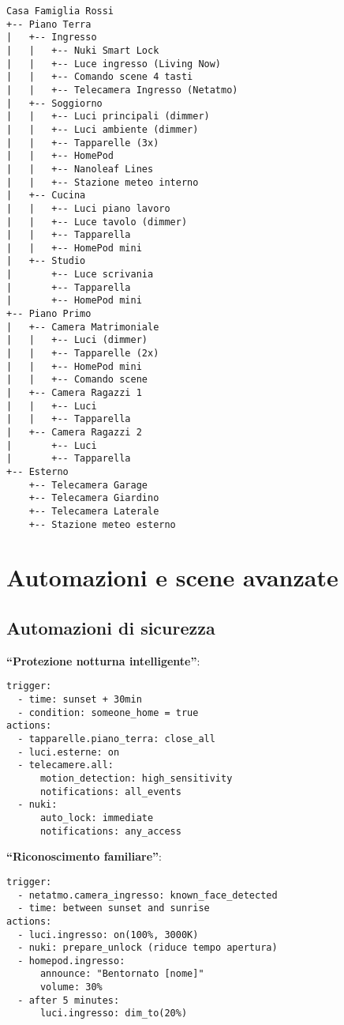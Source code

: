 \begin{verbatim}
Casa Famiglia Rossi
+-- Piano Terra
|   +-- Ingresso
|   |   +-- Nuki Smart Lock
|   |   +-- Luce ingresso (Living Now)
|   |   +-- Comando scene 4 tasti
|   |   +-- Telecamera Ingresso (Netatmo)
|   +-- Soggiorno
|   |   +-- Luci principali (dimmer)
|   |   +-- Luci ambiente (dimmer)
|   |   +-- Tapparelle (3x)
|   |   +-- HomePod
|   |   +-- Nanoleaf Lines
|   |   +-- Stazione meteo interno
|   +-- Cucina
|   |   +-- Luci piano lavoro
|   |   +-- Luce tavolo (dimmer)
|   |   +-- Tapparella
|   |   +-- HomePod mini
|   +-- Studio
|       +-- Luce scrivania
|       +-- Tapparella
|       +-- HomePod mini
+-- Piano Primo
|   +-- Camera Matrimoniale
|   |   +-- Luci (dimmer)
|   |   +-- Tapparelle (2x)
|   |   +-- HomePod mini
|   |   +-- Comando scene
|   +-- Camera Ragazzi 1
|   |   +-- Luci
|   |   +-- Tapparella
|   +-- Camera Ragazzi 2
|       +-- Luci
|       +-- Tapparella
+-- Esterno
    +-- Telecamera Garage
    +-- Telecamera Giardino
    +-- Telecamera Laterale
    +-- Stazione meteo esterno
\end{verbatim}

\section{Automazioni e scene avanzate}

\subsection{Automazioni di sicurezza}

\textbf{``Protezione notturna intelligente''}:
\begin{verbatim}
trigger:
  - time: sunset + 30min
  - condition: someone_home = true
actions:
  - tapparelle.piano_terra: close_all
  - luci.esterne: on
  - telecamere.all: 
      motion_detection: high_sensitivity
      notifications: all_events
  - nuki: 
      auto_lock: immediate
      notifications: any_access
\end{verbatim}

\textbf{``Riconoscimento familiare''}:
\begin{verbatim}
trigger:
  - netatmo.camera_ingresso: known_face_detected
  - time: between sunset and sunrise
actions:
  - luci.ingresso: on(100%, 3000K)
  - nuki: prepare_unlock (riduce tempo apertura)
  - homepod.ingresso: 
      announce: "Bentornato [nome]"
      volume: 30%
  - after 5 minutes:
      luci.ingresso: dim_to(20%)
\end{verbatim}

